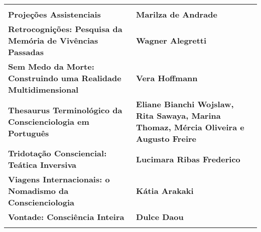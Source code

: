 \begin{longtable}[]{@{}
  >{\raggedright\arraybackslash}p{}
  >{\raggedright\arraybackslash}p{}@{}}
\begin{minipage}[b]{\linewidth}
\end{minipage} \\
\begin{minipage}[b]{\linewidth}\raggedright
\textbf{Projeções Assistenciais}
\end{minipage} & \begin{minipage}[b]{\linewidth}\raggedright
\textbf{Marilza de Andrade}
\end{minipage} \\
\begin{minipage}[b]{\linewidth}\raggedright
\textbf{Retrocognições: Pesquisa da Memória de Vivências Passadas}
\end{minipage} & \begin{minipage}[b]{\linewidth}\raggedright
\textbf{Wagner Alegretti}
\end{minipage} \\
\begin{minipage}[b]{\linewidth}\raggedright
\textbf{Sem Medo da Morte: Construindo uma Realidade Multidimensional}
\end{minipage} & \begin{minipage}[b]{\linewidth}\raggedright
\textbf{Vera Hoffmann}
\end{minipage} \\
\begin{minipage}[b]{\linewidth}\raggedright
\textbf{Thesaurus Terminológico da Conscienciologia em Português}
\end{minipage} & \begin{minipage}[b]{\linewidth}\raggedright
\textbf{Eliane Bianchi Wojslaw, Rita Sawaya, Marina Thomaz, Mércia Oliveira e Augusto Freire}
\end{minipage} \\
\begin{minipage}[b]{\linewidth}\raggedright
\textbf{Tridotação Consciencial: Teática Inversiva}
\end{minipage} & \begin{minipage}[b]{\linewidth}\raggedright
\textbf{Lucimara Ribas Frederico}
\end{minipage} \\
\begin{minipage}[b]{\linewidth}\raggedright
\textbf{Viagens Internacionais: o Nomadismo da Conscienciologia}
\end{minipage} & \begin{minipage}[b]{\linewidth}\raggedright
\textbf{Kátia Arakaki}
\end{minipage} \\
\begin{minipage}[b]{\linewidth}\raggedright
\textbf{Vontade: Consciência Inteira}
\end{minipage} & \begin{minipage}[b]{\linewidth}\raggedright
\textbf{Dulce Daou}
\end{minipage} \\
\midrule\noalign{}
\endhead
\bottomrule\noalign{}
\endlastfoot
\end{longtable}

